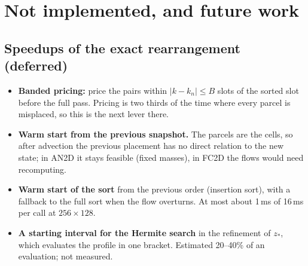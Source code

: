 \documentclass[11pt,a4paper]{article}
\newcommand{\zs}{z_{*}}
\begin{document}
\appendix
\section{Not implemented, and future work}\label{app:future}

\subsection{Speedups of the exact rearrangement (deferred)}
\begin{itemize}
  \item \textbf{Banded pricing:} price the pairs within $|k-k_n|\le B$ slots of the sorted slot before the full pass. Pricing is
        two thirds of the time where every parcel is misplaced, so this is the next lever there.
  \item \textbf{Warm start from the previous snapshot.} The parcels are the cells, so after advection the previous placement has
        no direct relation to the new state; in AN2D it stays feasible (fixed masses), in FC2D the flows would need recomputing.
  \item \textbf{Warm start of the sort} from the previous order (insertion sort), with a fallback to the full sort when the flow
        overturns. At most about 1\,ms of 16\,ms per call at $256\times128$.
  \item \textbf{A starting interval for the Hermite search} in the refinement of $\zs$, which evaluates the profile in one
        bracket. Estimated 20--40\% of an evaluation; not measured.
\end{itemize}
\end{document}
